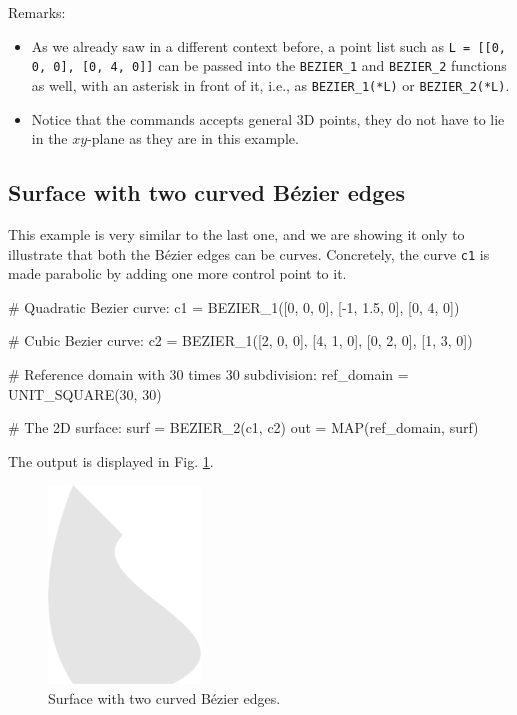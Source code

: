 \noindent
Remarks:
\begin{itemize}
\item As we already saw in a different context before, a point list
such as {\tt L = [[0, 0, 0], [0, 4, 0]]} can be passed into 
the {\tt BEZIER\_1} and {\tt BEZIER\_2} functions as well, with 
an asterisk in front of it, i.e., as {\tt BEZIER\_1(*L)} or {\tt BEZIER\_2(*L)}.
\item Notice that the commands accepts general 3D points, they do not have 
to lie in the $xy$-plane as they are in this example.
\end{itemize}

\subsection{Surface with two curved B\'ezier edges}

This example is very similar to the last one, and we are showing it 
only to illustrate that both the B\'ezier edges can be curves. 
Concretely, the curve {\tt c1} is made parabolic by adding one 
more control point to it. 

\begin{bluecode}
# Quadratic Bezier curve:
c1 = BEZIER_1([0, 0, 0], [-1, 1.5, 0], [0, 4, 0])

# Cubic Bezier curve:
c2 = BEZIER_1([2, 0, 0], [4, 1, 0], [0, 2, 0], [1, 3, 0])

# Reference domain with 30 times 30 subdivision:
ref_domain = UNIT_SQUARE(30, 30)

# The 2D surface:
surf = BEZIER_2(c1, c2)
out = MAP(ref_domain, surf)
\end{bluecode}

The output is displayed in Fig. \ref{fig:curves-2}.

\begin{figure}[!ht]
\begin{center}
\includegraphics[width=0.36\textwidth]{img/curves-2.png}
\end{center}
\vspace{-4mm}
\caption{Surface with two curved B\'ezier edges.}
\label{fig:curves-2}
\end{figure}

